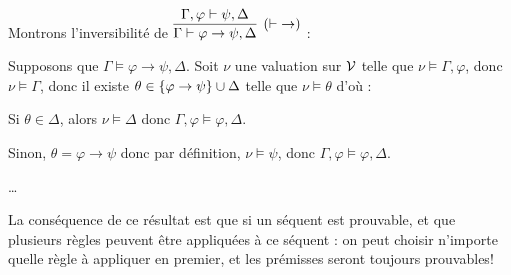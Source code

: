\documentclass[a4paper,french,bookmarks]{article}
\begin{document}
\begin{enumerate}
{\begin{enumerate}
                \itt Montrons l'inversibilité de $\infer[(\vdash\; \rightarrow)]{\Gamma \vdash \varphi \rightarrow \psi, \Delta}{\Gamma, \varphi \vdash \psi, \Delta}$ :
                
                Supposons que $\Gamma \vDash \varphi \rightarrow \psi, \Delta$. Soit $\nu$ une valuation sur $\mathcal{V}$ telle que $\nu \vDash \Gamma, \varphi$, donc $\nu \vDash \Gamma$, donc il existe $\theta \in \left\{\varphi \rightarrow \psi\right\} \cup \Delta$ telle que $\nu \vDash \theta$ d'où :
                \begin{enumerate}
                    \ithand Si $\theta \in \Delta$, alors $\nu \vDash \Delta$ donc $\Gamma, \varphi \vDash \varphi, \Delta$.
                    
                    \ithand Sinon, $\theta = \varphi \rightarrow \psi$ donc par définition, $\nu \vDash \psi$, donc $\Gamma, \varphi \vDash \varphi, \Delta$.
                \end{enumerate}
                
                \itt \dots
            \end{enumerate}
        }
        \nobefore\yesafter
        \yesbefore
    \end{enumerate}
        
        
        
    La conséquence de ce résultat est que si un séquent est prouvable, et que plusieurs règles peuvent être appliquées à ce séquent : on peut choisir n'importe quelle règle à appliquer en premier, et les prémisses seront toujours prouvables!
    
\end{document}
